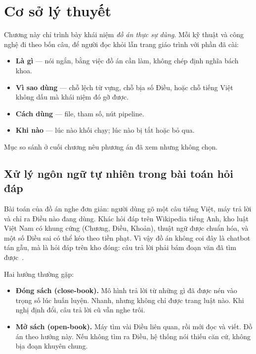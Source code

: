 \chapter{Cơ sở lý thuyết}

Chương này chỉ trình bày khái niệm \emph{đồ án thực sự dùng}. Mỗi kỹ thuật và
công nghệ đi theo bốn câu, để người đọc khỏi lẫn trang giáo trình với phần đã
cài:

\begin{itemize}
    \item \textbf{Là gì} --- nói ngắn, bằng việc đồ án cần làm, không chép định
    nghĩa bách khoa.
    \item \textbf{Vì sao dùng} --- chỗ lệch từ vựng, chỗ bịa số Điều, hoặc chỗ
    tiếng Việt không dấu mà khái niệm đó gỡ được.
    \item \textbf{Cách dùng} --- file, tham số, nút pipeline.
    \item \textbf{Khi nào} --- lúc nào khối chạy; lúc nào bị tắt hoặc bỏ qua.
\end{itemize}

Mục so sánh ở cuối chương nêu phương án đã xem nhưng không chọn.

\section{Xử lý ngôn ngữ tự nhiên trong bài toán hỏi đáp}

Bài toán của đồ án nghe đơn giản: người dùng gõ một câu tiếng Việt, máy trả lời
và chỉ ra Điều nào đang dùng. Khác hỏi đáp trên Wikipedia tiếng Anh, kho luật
Việt Nam có khung cứng (Chương, Điều, Khoản), thuật ngữ được chuẩn hóa, và một
số Điều sai có thể kéo theo tiền phạt. Vì vậy đồ án không coi đây là chatbot
tán gẫu, mà là hỏi đáp trên kho đóng: câu trả lời phải bám đoạn văn đã tìm
được~\cite{karpukhin2020dpr, lewis2020rag}.

Hai hướng thường gặp:

\begin{itemize}
    \item \textbf{Đóng sách (close-book).} Mô hình trả lời từ những gì đã được
    nén vào trọng số lúc huấn luyện. Nhanh, nhưng không chỉ được trang luật nào.
    Khi nghị định đổi, câu trả lời cũ vẫn nghe trôi.
    \item \textbf{Mở sách (open-book).} Máy tìm vài Điều liên quan, rồi mới đọc
    và viết. Đồ án theo hướng này. Nếu không tìm ra Điều, hệ thống nói thiếu
    căn cứ, không bịa đoạn khuyên chung.
\end{itemize}

